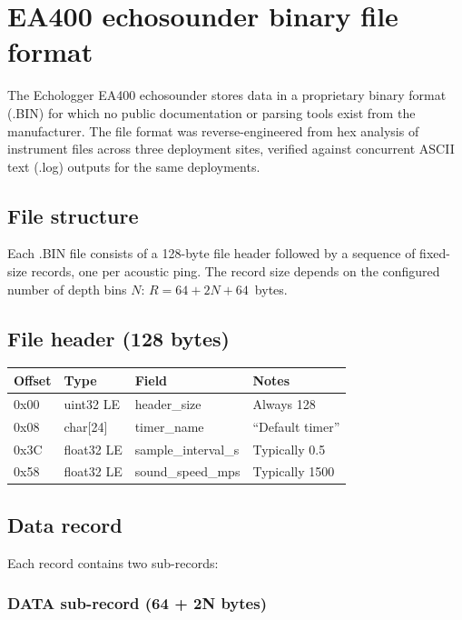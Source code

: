 
\appendix
\section{EA400 echosounder binary file format}
\label{app:bin_format}

The Echologger EA400 echosounder stores data in a proprietary binary
format (.BIN) for which no public documentation or parsing tools exist
from the manufacturer. The file format was reverse-engineered from hex
analysis of instrument files across three deployment sites, verified
against concurrent ASCII text (.log) outputs for the same deployments.

\subsection{File structure}

Each .BIN file consists of a 128-byte file header followed by a
sequence of fixed-size records, one per acoustic ping. The record size
depends on the configured number of depth bins $N$:
$R = 64 + 2N + 64$~bytes.

\subsection{File header (128 bytes)}

\begin{tabular}{llll}
\hline
Offset & Type & Field & Notes \\
\hline
0x00 & uint32 LE & header\_size & Always 128 \\
0x08 & char[24] & timer\_name & ``Default timer'' \\
0x3C & float32 LE & sample\_interval\_s & Typically 0.5 \\
0x58 & float32 LE & sound\_speed\_mps & Typically 1500 \\
\hline
\end{tabular}

\subsection{Data record}

Each record contains two sub-records:

\subsubsection{DATA sub-record (64 + 2N bytes)}

